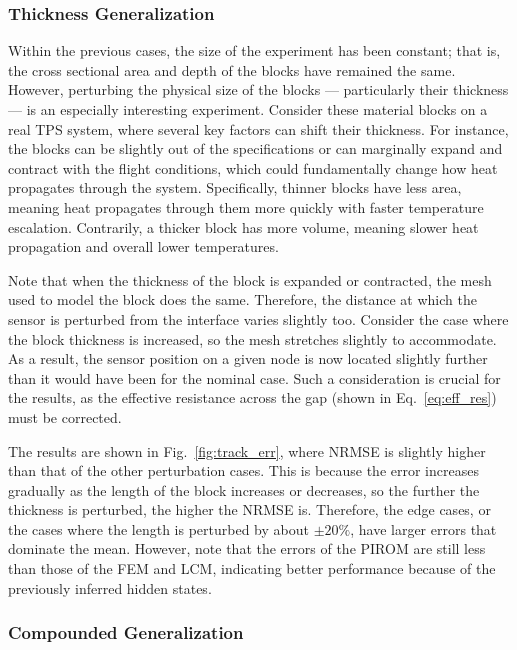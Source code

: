 \subsubsection{Thickness Generalization}

Within the previous cases, the size of the experiment has been constant; that is, the cross sectional area and depth of the blocks have remained the same. However, perturbing the physical size of the blocks --- particularly their thickness --- is an especially interesting experiment. Consider these material blocks on a real TPS system, where several key factors can shift their thickness. For instance, the blocks can be slightly out of the specifications or can marginally expand and contract with the flight conditions, which could fundamentally change how heat propagates through the system. Specifically, thinner blocks have less area, meaning heat propagates through them more quickly with faster temperature escalation. Contrarily, a thicker block has more volume, meaning slower heat propagation and overall lower temperatures.

Note that when the thickness of the block is expanded or contracted, the mesh used to model the block does the same. Therefore, the distance at which the sensor is perturbed from the interface varies slightly too. Consider the case where the block thickness is increased, so the mesh stretches slightly to accommodate. As a result, the sensor position on a given node is now located slightly further than it would have been for the nominal case. Such a consideration is crucial for the results, as the effective resistance across the gap (shown in Eq.~\eqref{eq:eff_res}) must be corrected. 

The results are shown in Fig.~\ref{fig:track_err}, where NRMSE is slightly higher than that of the other perturbation cases. This is because the error increases gradually as the length of the block increases or decreases, so the further the thickness is perturbed, the higher the NRMSE is. Therefore, the edge cases, or the cases where the length is perturbed by about $\pm 20\%$, have larger errors that dominate the mean. However, note that the errors of the PIROM are still less than those of the FEM and LCM, indicating better performance because of the previously inferred hidden states. 

\subsubsection{Compounded Generalization}

